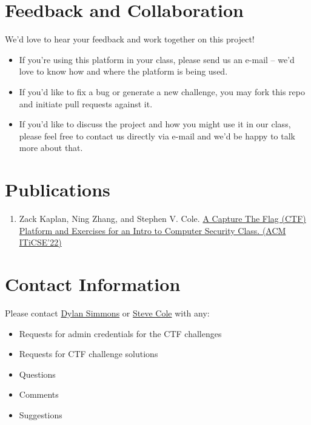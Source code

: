 \documentclass[11pt]{article}
\begin{document}
\section{Feedback and Collaboration}

We'd love to hear your feedback and work together on this project!

\begin{itemize}
   \item If you're using this platform in your class, please send us an e-mail --  we'd love to know how and where the platform is being used.
   \item If you'd like to fix a bug or generate a new challenge, you may fork this repo and initiate pull requests against it. 
   \item If you'd like to discuss the project and how you might use it in our class, please feel free to contact us directly via e-mail and we'd be happy to talk more about that.
\end{itemize}

\section{Publications}

\begin{enumerate}
   \item Zack Kaplan, Ning Zhang, and Stephen V. Cole. \href{https://doi.org/10.1145/3502717.3532153}{A Capture The Flag (CTF) Platform and Exercises for an Intro to Computer Security Class. (ACM ITiCSE'22)}
\end{enumerate}

\section{Contact Information}

Please contact \href{mailto:dylan.simmons@wustl.edu}{Dylan Simmons} or \href{mailto:svcole@wustl.edu}{Steve Cole} with any:

\begin{itemize}
   \item Requests for admin credentials for the CTF challenges
   \item Requests for CTF challenge solutions
   \item Questions
   \item Comments
   \item Suggestions
\end{itemize}
\end{document}
